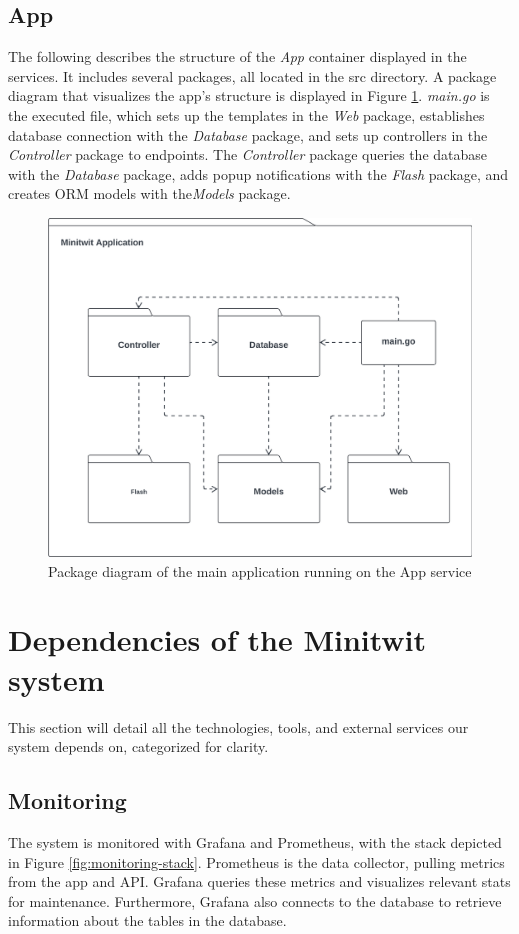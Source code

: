\documentclass[12pt, a4paper, oneside]{book}
\begin{document}
\subsection{App}
The following describes the structure of the \textit{App} container displayed in the services.
It includes several packages, all located in the src directory.
A package diagram that visualizes the app's structure is displayed in Figure \ref{fig:package-diagram-app}.
\textit{main.go} is the executed file, which sets up the templates in the \textit{Web} package, establishes database connection with the \textit{Database} package, and sets up controllers in the \textit{Controller} package to endpoints.
The \textit{Controller} package queries the database with the \textit{Database} package, adds popup notifications with the \textit{Flash} package, and creates ORM models with the\textit{Models} package.

\begin{figure}[H]
    \centering
    \includegraphics[width=0.6\linewidth]{images/uml-package-app.png}
    \caption{Package diagram of the main application running on the App service}
    \label{fig:package-diagram-app}
\end{figure}

\section{Dependencies of the Minitwit system}

This section will detail all the technologies, tools, and external services our system depends on, categorized for clarity.

\subsection{Monitoring}\label{sec:monitoring-architecture}
The system is monitored with Grafana and Prometheus, with the stack depicted in Figure \ref{fig:monitoring-stack}.
Prometheus is the data collector, pulling metrics from the app and API.
Grafana queries these metrics and visualizes relevant stats for maintenance.
Furthermore, Grafana also connects to the database to retrieve information about the tables in the database.
\end{document}
